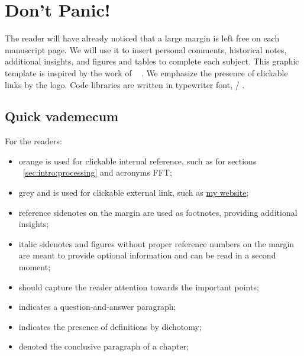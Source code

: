 \newpage
\section{Don't Panic!}
The reader will have already noticed that a large margin is left free on each manuscript page.
We will use it to insert personal comments, historical notes, additional insights, and figures and tables to complete each subject.
This graphic template is inspired by the work of \citeauthor{tufte1983visual}~
.
We emphasize the presence of clickable links by the \ExternalLink logo.
Code libraries are written in typewriter font, \eg/ .

\subsection{Quick vademecum}
For the readers:
\begin{itemize}
    \item \textcolor{myorange}{orange} is used for clickable internal reference, such as for sections ~\cref{sec:intro:processing} and acronyms \acs{FFT};
    \item \textcolor{mygray}{grey} and \ExternalLink is used for clickable external link, such as \href{www.diegodicarlo.com}{my website\ExternalLink};
    \item reference sidenotes on the margin are used as footnotes, providing additional insights;
    \item italic sidenotes and figures without proper reference numbers on the margin are meant to provide optional information and can be read in a second moment;
    \item \textcolor{black!30}{\scriptsize\raisebox{1pt}{$\blacktriangleright$}}\hspace{0.2em}should capture the reader attention towards the important points;
    \item \textcolor{black!30}{\scriptsize{}}\hspace{0.2em}indicates a question-and-answer paragraph;
    \item \textcolor{black!30}{\scriptsize\raisebox{1pt}{$\rightleftarrows$}}\hspace{0.2em}indicates the presence of definitions by dichotomy;
    \item \textcolor{myorange}{\scriptsize\raisebox{1pt}{\faAsterisk}}\hspace{0.2em}denoted the conclusive paragraph of a chapter;
\end{itemize}

